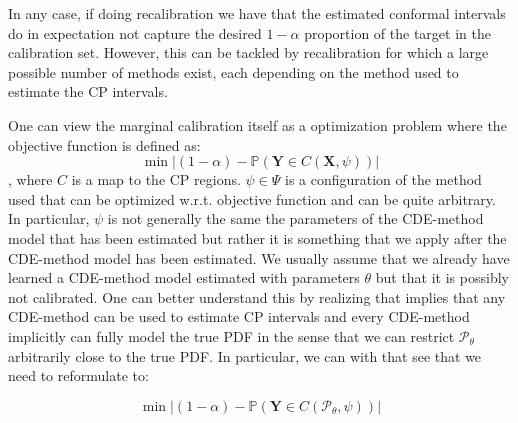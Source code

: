 In any case, if doing recalibration we have that the estimated conformal intervals do in expectation not capture the desired $1 - \alpha$ proportion of the target in the calibration set. However, this can be tackled by recalibration for which a large possible number of methods exist, each depending on the method used to estimate the CP intervals.

One can view the marginal calibration itself as a optimization problem where the objective function is defined as:
\begin{equation}
    \min |(1 - \alpha) - \mathbb{P}(\mathbf{Y} \in C(\mathbf{X}, \psi))|
    \label{eq:calibration_objective}
\end{equation}
, where $C$ is a map to the CP regions. $\psi\in\Psi$ is a configuration of the method used that can be optimized w.r.t. objective function and can be quite arbitrary. In particular, $\psi$ is not generally the same the parameters of the CDE-method model that has been estimated but rather it is something that we apply after the CDE-method model has been estimated. We usually assume that we already have learned a CDE-method model estimated with parameters $\theta$ but that it is possibly not calibrated. One can better understand this by realizing that  implies that any CDE-method can be used to estimate CP intervals and every CDE-method implicitly can fully model the true PDF in the sense that we can restrict $\mathcal{P}_{\theta}$ arbitrarily close to the true PDF. In particular, we can with that see that we need to reformulate  to:

\begin{equation}
    \min |(1 - \alpha) - \mathbb{P}(\mathbf{Y} \in C(\mathcal{P}_{\theta}, \psi))|
    \label{eq:calibration_objective_formal}
\end{equation}

